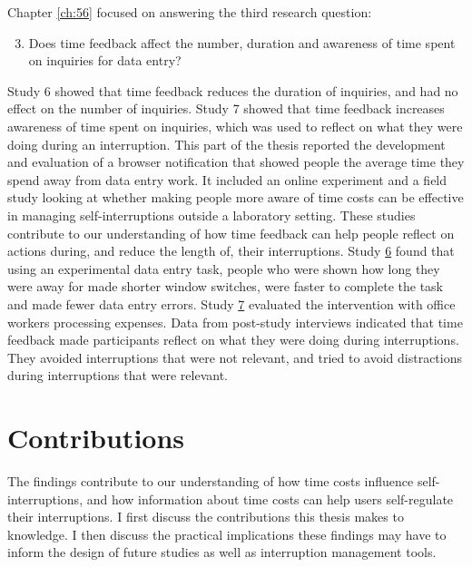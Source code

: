 Chapter \ref{ch:56} focused on answering the third research question:

\begin{enumerate}
\setcounter{enumi}{2}
\item
Does time feedback affect the number, duration and awareness of time spent on inquiries for data entry?
\end{enumerate}

Study 6 showed that time feedback reduces the duration of inquiries, and had no effect on the number of inquiries. Study 7 showed that time feedback increases awareness of time spent on inquiries, which was used to reflect on what they were doing during an interruption. 
This part of the thesis reported the development and evaluation of a browser notification that showed people the average time they spend away from data entry work. It included an online experiment and a field study looking at whether making people more aware of time costs can be effective in managing self-interruptions outside a laboratory setting. These studies contribute to our understanding of how time feedback can help people reflect on actions during, and reduce the length of, their interruptions. Study \hyperref[st:Study6]{6} found that using an experimental data entry task, people who were shown how long they were away for made shorter window switches, were faster to complete the task and made fewer data entry errors. Study \hyperref[st:Study7]{7} evaluated the intervention with office workers processing expenses. Data from post-study interviews indicated that time feedback made participants reflect on what they were doing during interruptions. They avoided interruptions that were not relevant, and tried to avoid distractions during interruptions that were relevant. 

\section{Contributions}
The findings contribute to our understanding of how time costs influence self-interruptions, and how information about time costs can help users self-regulate their interruptions. I first discuss the contributions this thesis makes to knowledge. I then discuss the practical implications these findings may have to inform the design of future studies as well as interruption management tools. 




